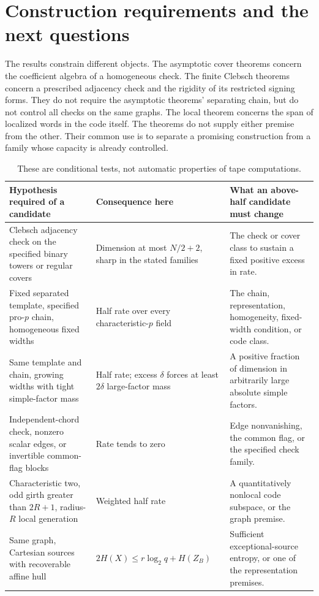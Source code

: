 \section{Construction requirements and the next questions}\label{sec:roadmap}

The results constrain different objects. The asymptotic cover
theorems concern the coefficient algebra of a homogeneous check.
The finite Clebsch theorems concern a prescribed adjacency check and
the rigidity of its restricted signing forms. They do not require
the asymptotic theorems' separating chain, but do not control all
checks on the same graphs.
The local theorem concerns the span of localized words in the code
itself. The theorems do not supply either premise from the other.
Their common use is to
separate a promising construction from a family whose capacity is
already controlled.

\begin{table}[htbp]
\centering\small
\begin{tabular}{@{}>{\raggedright\arraybackslash}p{4.0cm}>{\raggedright\arraybackslash}p{4.5cm}>{\raggedright\arraybackslash}p{6.0cm}@{}}
\toprule
Hypothesis required of a candidate & Consequence here & What an above-half candidate must change \\
\midrule
Clebsch adjacency check on the specified binary towers or regular covers
& Dimension at most $N/2+2$, sharp in the stated families
& The check or cover class to sustain a fixed positive excess in rate. \\[4pt]
Fixed separated template, specified pro-$p$ chain, homogeneous fixed widths
& Half rate over every characteristic-$p$ field
& The chain, representation, homogeneity, fixed-width condition, or code class. \\[4pt]
Same template and chain, growing widths with tight simple-factor mass
& Half rate; excess $\delta$ forces at least $2\delta$ large-factor mass
& A positive fraction of dimension in arbitrarily large absolute simple factors. \\[4pt]
Independent-chord check, nonzero scalar edges, or invertible common-flag blocks
& Rate tends to zero
& Edge nonvanishing, the common flag, or the specified check family. \\[4pt]
Characteristic two, odd girth greater than $2R+1$, radius-$R$ local generation
& Weighted half rate
& A quantitatively nonlocal code subspace, or the graph premise. \\[4pt]
Same graph, Cartesian sources with recoverable affine hull
& $2H(X)\le r\log_2q+H(Z_B)$
& Sufficient exceptional-source entropy, or one of the representation premises. \\
\bottomrule
\end{tabular}
\caption{These are conditional tests, not automatic properties of tape computations.}
\label{tab:requirements}
\end{table}
\FloatBarrier

